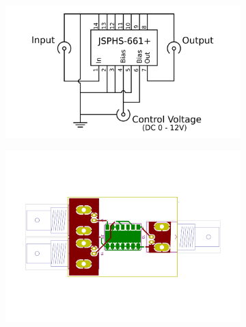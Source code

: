 \begin{figure}[ht]
	\centering
	\begin{subfigure}{0.4\textwidth}
		\centering
		\includegraphics[width=\textwidth]{Chapters/Deflection/circuit_phase}
		\caption{}
		\label{fig:circuit_phase}
	\end{subfigure}
	\hspace{0.1\textwidth}
	\begin{subfigure}{0.4\textwidth}
		\centering
		\includegraphics[width=\textwidth]{Chapters/Deflection/PCB_phase3}
		\caption{}
		\label{fig:PCB_phase}
	\end{subfigure}
	\caption{}
	\label{fig:PhaseShifter}
\end{figure}




